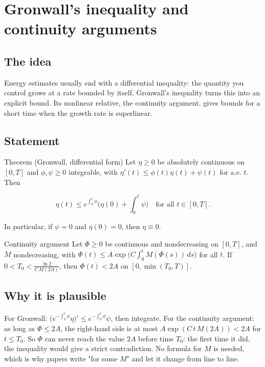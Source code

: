 
\section{Gronwall's inequality and continuity arguments}\label{p:gronwall}

\subsection*{The idea}

Energy estimates usually end with a differential inequality: the quantity you control grows at a rate bounded by itself. Gronwall's inequality turns this into an explicit bound. Its nonlinear relative, the continuity argument, gives bounds for a short time when the growth rate is superlinear.

\subsection*{Statement}

\begin{thmbox}{Theorem (Gronwall, differential form)}
%
Let $\eta\ge0$ be absolutely continuous on $[0,T]$ and $\phi,\psi\ge0$ integrable, with $\eta'(t)\le\phi(t)\eta(t)+\psi(t)$ for a.e. $t$. Then

\[ \eta(t)\le e^{\int_0^t\phi}\Big(\eta(0)+\int_0^t\psi\Big)\quad\text{for all } t\in[0,T]. \]

In particular, if $\psi = 0$ and $\eta(0)=0$, then $\eta\equiv0$.
\end{thmbox}

\begin{thmbox}{Continuity argument}
%
Let $\Phi\ge0$ be continuous and nondecreasing on $[0,T]$, and $M$ nondecreasing, with $\Phi(t)\le A\exp\big(C\int_0^t M(\Phi(s))\,ds\big)$ for all $t$. If $0< T_0< \frac{\ln 2}{C\,M(2A)}$, then $\Phi(t)< 2A$ on $[0,\min(T_0,T)]$.
\end{thmbox}

\subsection*{Why it is plausible}

For Gronwall: $\big(e^{-\int_0^t\phi}\eta\big)'\le e^{-\int_0^t\phi}\psi$, then integrate. For the continuity argument: as long as $\Phi\le 2A$, the right-hand side is at most $A\exp(C\,t\,M(2A))< 2A$ for $t\le T_0$. So $\Phi$ can never reach the value $2A$ before time $T_0$: the first time it did, the inequality would give a strict contradiction. No formula for $M$ is needed, which is why papers write "for some $M$" and let it change from line to line.

